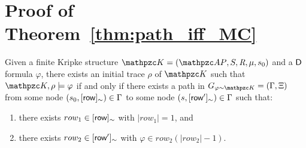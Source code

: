 \section{Proof of Theorem~\ref{thm:path_iff_MC}}\label{proof:thm:path_iff_MC}

\begin{theorem*}[\ref{thm:path_iff_MC}]
Given a finite Kripke structure $\Ku=\KuDef$ and a $\mathsf{D}$ formula $\varphi$, 
there exists an initial trace $\rho$ of $\Ku$ such that $\Ku,\rho\models\varphi$
if and only if
there exists
a path  in $G_{\varphi \sim\Ku}=(\Gamma, \Xi)$
from some node $(s_0,[\text{{\sffamily row}}]_\sim)\in\Gamma$ to some node $(s,[\text{{\sffamily row}}']_\sim)\in\Gamma$ such that:
\begin{enumerate}
    \item there exists $row_1\in[\text{{\sffamily row}}]_\sim$ with $|row_1|=1$, and
    \item there exists $row_2\in[\text{{\sffamily row}}']_\sim$ with $\varphi\in row_2(|row_2|-1)$.
\end{enumerate}
\end{theorem*}

